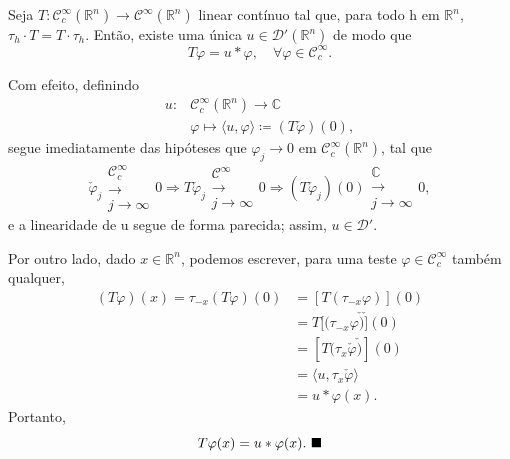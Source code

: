 \documentclass[../distribution_theory_notes.tex]{subfiles}
\begin{document}
\begin{theorem*}
	Seja \(T:\mathcal{C}_{c}^{\infty}(\mathbb{R}^{n})\rightarrow \mathcal{C}^{\infty}(\mathbb{R}^{n})\) linear contínuo tal que, para todo h em \(\mathbb{R}^{n}\), \(\tau_{h} \cdot T = T \cdot \tau_{h}\). Então, existe uma única \(u\in \mathcal{D}'(\mathbb{R}^{n})\) de modo que
	\[
		T\varphi = u*\varphi ,\quad \forall \varphi \in \mathcal{C}_{c}^{\infty}.
	\]
\end{theorem*}
\begin{proof*}
	Com efeito, definindo
	\begin{align*}
		u: & \mathcal{C}_{c}^{\infty}(\mathbb{R}^{n})\rightarrow \mathbb{C}                   \\
		   & \varphi \longmapsto \langle u, \varphi  \rangle\coloneqq (T\check{\varphi })(0),
	\end{align*}
	segue imediatamente das hipóteses que \(\varphi_{j} \rightarrow 0\) em \(\mathcal{C}_{c}^{\infty}(\mathbb{R}^{n})\), tal que
	\[
		\check{\varphi }_{j} \substack{\mathcal{C}_{c}^{\infty} \\ \longrightarrow \\ j\to \infty}0 \Rightarrow T\check{\varphi }_{j} \substack{\mathcal{C}^{\infty} \\ \longrightarrow \\ j\to \infty}0 \Rightarrow (T\check{\varphi }_{j})(0)\substack{\mathbb{C} \\ \longrightarrow \\ j\to \infty}0,
	\]
	e a linearidade de u segue de forma parecida; assim, \(u\in \mathcal{D}'\).

	Por outro lado, dado \(x\in \mathbb{R}^{n}\), podemos escrever, para uma teste \(\varphi \in \mathcal{C}_{c}^{\infty}\) também qualquer,
	\begin{align*}
		(T\varphi )(x)=\tau_{-x}(T\varphi )(0) & = [T(\tau_{-x} \varphi )](0)                  \\
		                                       & = T[(\tau_{-x} \varphi \check{)}\check{]}(0)  \\
		                                       & = [T(\tau_{x}\check{\varphi }\check{)}](0)    \\
		                                       & = \langle u, \tau_{x}\check{\varphi } \rangle \\
		                                       & = u*\varphi (x).
	\end{align*}
	Portanto,
	\[
		T\varphi (x)= u * \varphi (x). \text{ $\blacksquare$}
	\]
\end{proof*}
\end{document}

